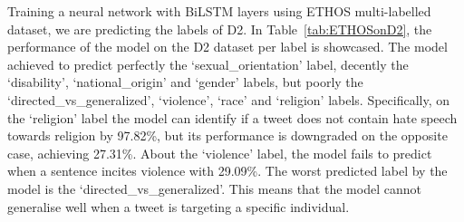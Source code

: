 \documentclass{article}
\begin{document}
\begin{table}[ht]
\label{tab:ETHOSonD2}
\end{table}


Training a neural network with BiLSTM layers using ETHOS multi-labelled dataset, we are predicting the labels of D2. In Table~\ref{tab:ETHOSonD2}, the performance of the model on the D2 dataset per label is showcased. The model achieved to predict perfectly the `sexual\_orientation' label, decently the `disability', `national\_origin' and `gender' labels, but poorly the `directed\_vs\_generalized', `violence', `race' and `religion' labels. Specifically, on the `religion' label the model can identify if a tweet does not contain hate speech towards religion by 97.82\%, but its performance is downgraded on the opposite case, achieving 27.31\%. About the `violence' label, the model fails to predict when a sentence incites violence with 29.09\%. The worst predicted label by the model is the `directed\_vs\_generalized'. This means that the model cannot generalise well when a tweet is targeting a specific individual.
\end{document}
